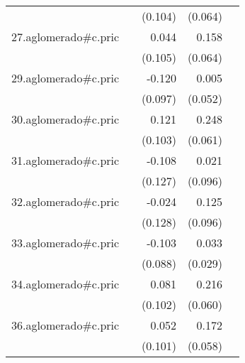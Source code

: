 {\begin{longtable}{l*{4}{D{.}{.}{-1}}}
            &                     &     (0.104)         &     (0.064)         &                     \\
\addlinespace
27.aglomerado#c.pric&                     &       0.044         &       0.158\sym{*}  &                     \\
            &                     &     (0.105)         &     (0.064)         &                     \\
\addlinespace
29.aglomerado#c.pric&                     &      -0.120         &       0.005         &                     \\
            &                     &     (0.097)         &     (0.052)         &                     \\
\addlinespace
30.aglomerado#c.pric&                     &       0.121         &       0.248\sym{***}&                     \\
            &                     &     (0.103)         &     (0.061)         &                     \\
\addlinespace
31.aglomerado#c.pric&                     &      -0.108         &       0.021         &                     \\
            &                     &     (0.127)         &     (0.096)         &                     \\
\addlinespace
32.aglomerado#c.pric&                     &      -0.024         &       0.125         &                     \\
            &                     &     (0.128)         &     (0.096)         &                     \\
\addlinespace
33.aglomerado#c.pric&                     &      -0.103         &       0.033         &                     \\
            &                     &     (0.088)         &     (0.029)         &                     \\
\addlinespace
34.aglomerado#c.pric&                     &       0.081         &       0.216\sym{***}&                     \\
            &                     &     (0.102)         &     (0.060)         &                     \\
\addlinespace
36.aglomerado#c.pric&                     &       0.052         &       0.172\sym{**} &                     \\
            &                     &     (0.101)         &     (0.058)         &                     \\

\end{longtable}}
